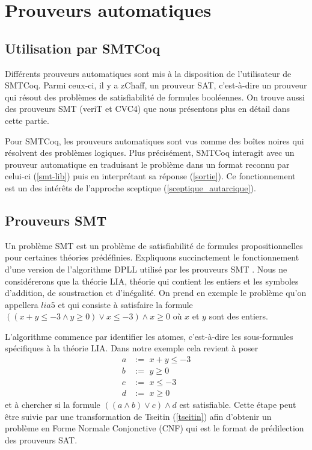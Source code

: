 \documentclass[11pt]{article}
\begin{document}
\newpage
\section{Prouveurs automatiques} \label{fonctionnement_prouveurs}

\subsection{Utilisation par SMTCoq}

Différents prouveurs automatiques sont mis à la disposition de l'utilisateur de SMTCoq. Parmi ceux-ci, il y a zChaff, un prouveur SAT, c'est-à-dire un prouveur qui résout des problèmes de satisfiabilité de formules booléennes. On trouve aussi des prouveurs SMT (veriT et CVC4) que nous présentons plus en détail dans cette partie.\medbreak 

Pour SMTCoq, les prouveurs automatiques sont vus comme des boîtes noires qui résolvent des problèmes logiques. Plus précisément, SMTCoq interagit avec un prouveur automatique en traduisant le problème dans un format reconnu par celui-ci (\ref{smt-lib}) puis en interprétant sa réponse (\ref{sortie}). Ce fonctionnement est un des intérêts de l'approche sceptique (\ref{sceptique_autarcique}).

\subsection{Prouveurs SMT} \label{smt}

Un problème SMT est un problème de satisfiabilité de formules propositionnelles pour certaines théories prédéfinies. Expliquons succinctement le fonctionnement d'une version de l'algorithme DPLL utilisé par les prouveurs SMT \cite{dpll}. Nous ne considérerons que la théorie LIA, théorie qui contient les entiers et les symboles d'addition, de soustraction et d'inégalité. On prend en exemple le problème qu'on appellera $lia5$ et qui consiste à satisfaire la formule $((x + y \leq -3 \wedge y \geq 0) \vee x \leq -3) \wedge x \geq 0$ où $x$ et $y$ sont des entiers. \medbreak

L'algorithme commence par identifier les atomes, c'est-à-dire les sous-formules spécifiques à la théorie LIA. Dans notre exemple cela revient à poser 
\begin{align*}
a &:= \,\, x + y \leq -3 \\
b &:=\,\, y \geq 0 \\
c &:= \,\,x \leq -3 \\
d &:= \,\,x \geq 0
\end{align*}
et à chercher si la formule  $((a \wedge b) \vee c) \wedge d$ est satisfiable. Cette étape peut être suivie par une transformation de Tseitin (\ref{tseitin}) afin d'obtenir un problème en Forme Normale Conjonctive (CNF) qui est le format de prédilection des prouveurs SAT. \medbreak
\end{document}
